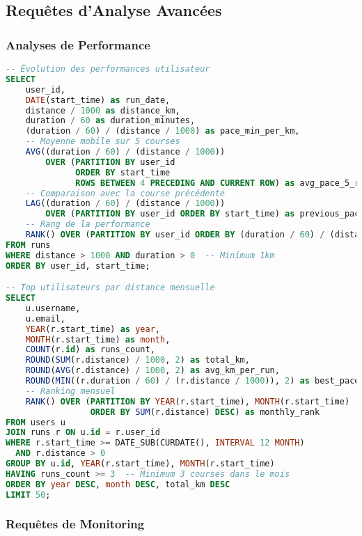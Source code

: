 \subsection{Requêtes d'Analyse Avancées}

\subsubsection{Analyses de Performance}

\begin{lstlisting}[language=sql]
-- Évolution des performances utilisateur
SELECT 
    user_id,
    DATE(start_time) as run_date,
    distance / 1000 as distance_km,
    duration / 60 as duration_minutes,
    (duration / 60) / (distance / 1000) as pace_min_per_km,
    -- Moyenne mobile sur 5 courses
    AVG((duration / 60) / (distance / 1000)) 
        OVER (PARTITION BY user_id 
              ORDER BY start_time 
              ROWS BETWEEN 4 PRECEDING AND CURRENT ROW) as avg_pace_5_runs,
    -- Comparaison avec la course précédente
    LAG((duration / 60) / (distance / 1000)) 
        OVER (PARTITION BY user_id ORDER BY start_time) as previous_pace,
    -- Rang de la performance
    RANK() OVER (PARTITION BY user_id ORDER BY (duration / 60) / (distance / 1000)) as pace_rank
FROM runs
WHERE distance > 1000 AND duration > 0  -- Minimum 1km
ORDER BY user_id, start_time;

-- Top utilisateurs par distance mensuelle
SELECT 
    u.username,
    u.email,
    YEAR(r.start_time) as year,
    MONTH(r.start_time) as month,
    COUNT(r.id) as runs_count,
    ROUND(SUM(r.distance) / 1000, 2) as total_km,
    ROUND(AVG(r.distance) / 1000, 2) as avg_km_per_run,
    ROUND(MIN((r.duration / 60) / (r.distance / 1000)), 2) as best_pace,
    -- Ranking mensuel
    RANK() OVER (PARTITION BY YEAR(r.start_time), MONTH(r.start_time) 
                 ORDER BY SUM(r.distance) DESC) as monthly_rank
FROM users u
JOIN runs r ON u.id = r.user_id
WHERE r.start_time >= DATE_SUB(CURDATE(), INTERVAL 12 MONTH)
  AND r.distance > 0
GROUP BY u.id, YEAR(r.start_time), MONTH(r.start_time)
HAVING runs_count >= 3  -- Minimum 3 courses dans le mois
ORDER BY year DESC, month DESC, total_km DESC
LIMIT 50;
\end{lstlisting}

\subsubsection{Requêtes de Monitoring}

